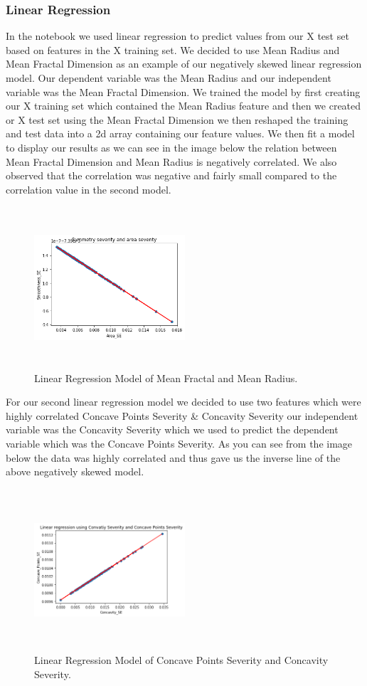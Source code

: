 \documentclass[conference]{IEEEtran}
\begin{document}
\subsubsection{Linear Regression}
In the notebook we used linear regression to predict values from our X test set based on features in the X training set.  We decided to use  Mean Radius  and Mean Fractal Dimension as an example of our negatively skewed linear regression model.  Our dependent variable was the Mean Radius and our independent variable was the Mean Fractal Dimension.   We trained the model by first creating our X training set which contained the Mean Radius feature and then we created or X test set using the Mean Fractal Dimension we then reshaped the training and test data into a 2d array containing our feature values.  We then fit a model to display our results as we can see in the image below the relation between Mean Fractal Dimension and Mean Radius is negatively correlated.  We also observed that the correlation was negative and fairly small compared to the correlation value in the second model.
\begin{figure}[H]
\caption{Linear Regression Model of Mean Fractal and Mean Radius.}
\centering
\includegraphics[height=60mm,width=0.5\textwidth]{Images/negatively_skewed_linear_regression.png}
\end{figure}
For our second linear regression model we decided to use two features which were highly correlated Concave Points Severity \& Concavity Severity our independent variable was the  Concavity Severity which we used to predict the dependent variable which was the Concave Points Severity.  As you can see from the image below the data was highly correlated and thus gave us the inverse line of the above negatively skewed model.
\begin{figure}[H]
\caption{Linear Regression Model of Concave Points Severity and Concavity Severity.}
\centering
\includegraphics[height=60mm,width=0.5\textwidth]{Images/positively_skewed_linear_regression.png}
\end{figure}
\end{document}

